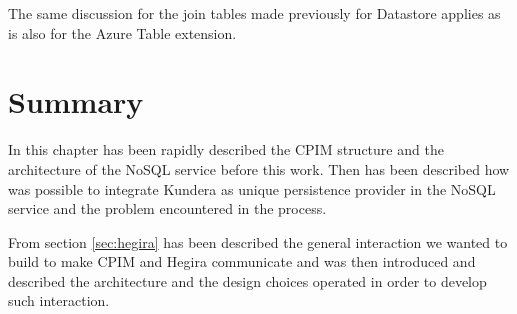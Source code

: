 \noindent The same discussion for the join tables made previously for Datastore applies as is also for the Azure Table extension.

\section{Summary}
In this chapter has been rapidly described the CPIM structure and the architecture of the NoSQL service before this work. Then has been described how was possible to integrate Kundera as unique persistence provider in the NoSQL service and the problem encountered in the process.

\noindent From section \ref{sec:hegira} has been described the general interaction we wanted to build to make CPIM and Hegira communicate and was then introduced and described the architecture and the design choices operated in order to develop such interaction. 
